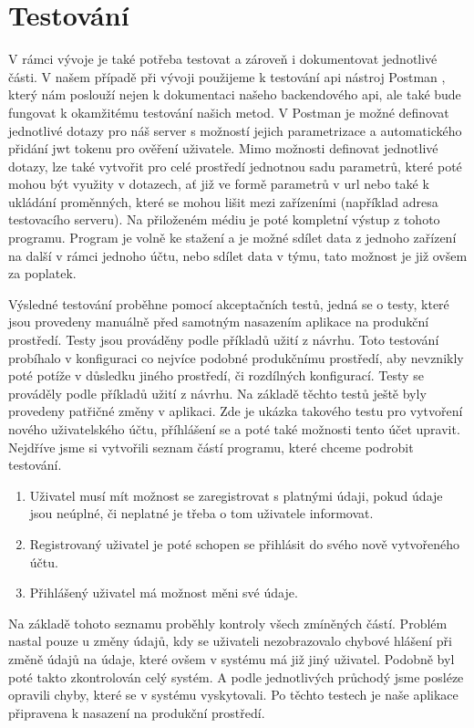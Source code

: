 \section{Testování}

V rámci vývoje je také potřeba testovat a zároveň i dokumentovat jednotlivé části. V našem případě při vývoji použijeme
k testování \gls{api} nástroj Postman \cite{postmanSW}, který nám poslouží nejen k dokumentaci našeho backendového \gls{api},
ale také bude fungovat k okamžitému testování našich metod. V Postman je možné definovat jednotlivé dotazy pro náš server s možností
jejich parametrizace a automatického přidání \gls{jwt} tokenu pro ověření uživatele. Mimo možnosti definovat jednotlivé dotazy, lze také vytvořit
pro celé prostředí jednotnou sadu parametrů, které poté mohou být využity v dotazech, ať již ve formě parametrů v \gls{url} nebo také k ukládání
proměnných, které se mohou lišit mezi zařízeními (například adresa testovacího serveru). Na přiloženém médiu je poté kompletní výstup z
tohoto programu. Program je volně ke stažení a je možné sdílet data z jednoho zařízení na další v rámci jednoho účtu, nebo sdílet data
v týmu, tato možnost je již ovšem za poplatek.

Výsledné testování proběhne pomocí akceptačních testů, jedná se o testy,
které jsou provedeny manuálně před samotným nasazením aplikace na produkční prostředí. Testy jsou prováděny podle příkladů užití z návrhu.
Toto testování probíhalo v konfiguraci co nejvíce podobné produkčnímu prostředí, aby nevznikly poté potíže v důsledku jiného prostředí, či
rozdílných konfigurací. Testy se prováděly podle příkladů užití z návrhu. Na základě těchto testů ještě byly provedeny patřičné změny v aplikaci.
Zde je ukázka takového testu pro vytvoření nového uživatelského účtu, příhlášení se a poté také možnosti tento účet upravit.
Nejdříve jsme si vytvořili seznam částí programu, které chceme podrobit testování.
\begin{enumerate}
    \item Uživatel musí mít možnost se zaregistrovat s platnými údaji, pokud údaje jsou neúplné, či neplatné je třeba o tom uživatele informovat.
    \item Registrovaný uživatel je poté schopen se přihlásit do svého nově vytvořeného účtu.
    \item Přihlášený uživatel má možnost měni své údaje.
\end{enumerate}
Na základě tohoto seznamu proběhly kontroly všech zmíněných částí. Problém nastal pouze u změny údajů, kdy se uživateli nezobrazovalo chybové
hlášení při změně údajů na údaje, které ovšem v systému má již jiný uživatel. Podobně byl poté takto zkontrolován celý systém.
A podle jednotlivých průchodý jsme posléze opravili chyby, které se v systému vyskytovali. Po těchto testech je naše aplikace
připravena k nasazení na produkční prostředí.

